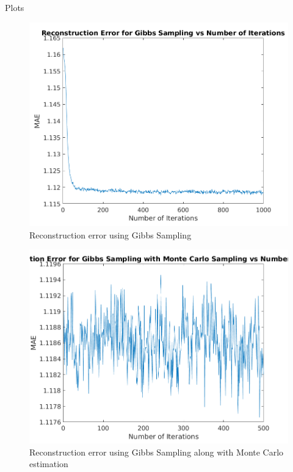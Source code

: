 \documentclass{article}
\begin{document}
\clearpage

\begin{question}

	\begin{qsection}{Plots}
		\begin{figure}[h!]
			\centering
			\includegraphics[width=12cm]{plots/gibbs.png}
			\caption{Reconstruction error using Gibbs Sampling}
		\end{figure}

		\begin{figure}[h!]
			\centering
			\includegraphics[width=12cm]{plots/gibbs_mc.png}
			\caption{Reconstruction error using Gibbs Sampling along with Monte Carlo estimation}
		\end{figure}

	\end{qsection}


\end{question}
\end{document}
